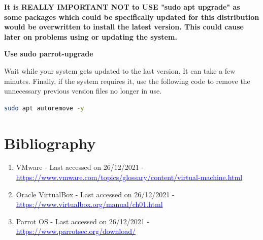 \documentclass[a4paper]{article}
\newcommand{\sectionName}{Contents}
\newcommand\tab[1][1cm]{\hspace*{#1}}
\begin{document}
    \vspace{0.5cm}

    \begin{tcolorbox}[colback=red!25!white,colframe=red]
        \centering
        \textbf{It is REALLY IMPORTANT NOT to USE "sudo apt upgrade" as some packages which could be specifically 
        updated for this distribution would be overwritten to install the latest version.
        This could cause later on problems using or updating the system.}
    \end{tcolorbox}

    \vspace{0.5cm}

    \begin{tcolorbox}[colback=green!25!white,colframe=green]
        \centering
        \textbf{Use sudo parrot-upgrade}
    \end{tcolorbox}

    \vspace{0.5cm}

    \tab Wait while your system gets updated to the last version. It can take a few minutes.
    Finally, if the system requires it, use the following code to remove the unnecessary previous version files no longer in use.

    \begin{lstlisting}[language=Bash, caption=Removing deprecated files.]
        sudo apt autoremove -y
    \end{lstlisting}

    \clearpage
    \section{Bibliography}
    \renewcommand{\sectionName}{Bibliography}

    \begin{enumerate}
        \item VMware - Last accessed on 26/12/2021 - \href{https://www.vmware.com/topics/glossary/content/virtual-machine.html}{\textcolor{blue}{https://www.vmware.com/topics/glossary/content/virtual-machine.html}}
        \item Oracle VirtualBox - Last accessed on 26/12/2021 - \href{https://www.virtualbox.org/manual/ch01.html}{\textcolor{blue}{https://www.virtualbox.org/manual/ch01.html}}
        \item Parrot OS - Last accessed on 26/12/2021 - \href{https://www.parrotsec.org/download/}{\textcolor{blue}{https://www.parrotsec.org/download/}}
    \end{enumerate}
\end{document}
